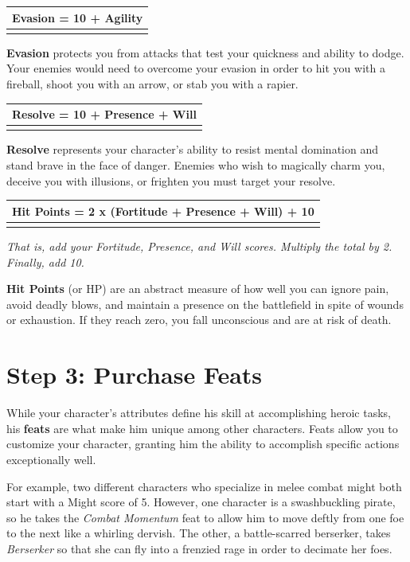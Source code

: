 \documentclass[12pt]{report}
\begin{document}
\begin{longtable}[c]{@{}l@{}}
\toprule
Evasion = 10 + Agility\tabularnewline
\midrule
\endhead
\tabularnewline
\bottomrule
\end{longtable}

\textbf{Evasion} protects you from attacks that test your quickness and
ability to dodge. Your enemies would need to overcome your evasion in
order to hit you with a fireball, shoot you with an arrow, or stab you
with a rapier.

\begin{longtable}[c]{@{}l@{}}
\toprule
Resolve = 10 + Presence + Will\tabularnewline
\midrule
\endhead
\tabularnewline
\bottomrule
\end{longtable}

\textbf{Resolve} represents your character's ability to resist mental
domination and stand brave in the face of danger. Enemies who wish to
magically charm you, deceive you with illusions, or frighten you must
target your resolve.

\begin{longtable}[c]{@{}l@{}}
\toprule
Hit Points = 2 x (Fortitude + Presence + Will) + 10\tabularnewline
\midrule
\endhead
\tabularnewline
\bottomrule
\end{longtable}

\emph{That is, add your Fortitude, Presence, and Will scores. Multiply
the total by 2. Finally, add 10.}

\textbf{Hit Points} (or HP) are an abstract measure of how well you can
ignore pain, avoid deadly blows, and maintain a presence on the
battlefield in spite of wounds or exhaustion. If they reach zero, you
fall unconscious and are at risk of death.

\section{Step 3: Purchase Feats}\label{step-3-purchase-feats}

While your character's attributes define his skill at accomplishing
heroic tasks, his \textbf{feats} are what make him unique among other
characters. Feats allow you to customize your character, granting him
the ability to accomplish specific actions exceptionally well.

For example, two different characters who specialize in melee combat
might both start with a Might score of 5. However, one character is a
swashbuckling pirate, so he takes the \emph{Combat Momentum} feat to
allow him to move deftly from one foe to the next like a whirling
dervish. The other, a battle-scarred berserker, takes \emph{Berserker}
so that she can fly into a frenzied rage in order to decimate her foes.
\end{document}
